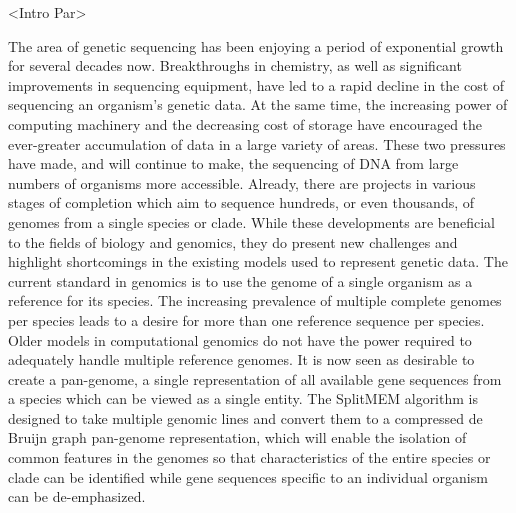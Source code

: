 \documentclass{paper}
\begin{document}
<Intro Par>
\newline\newline

The area of genetic sequencing has been enjoying a period of exponential growth for several decades now. Breakthroughs in chemistry, as well as significant improvements in sequencing equipment, have led to a rapid decline in the cost of sequencing an organism's genetic data. At the same time, the increasing power of computing machinery and the decreasing cost of storage have encouraged the ever-greater accumulation of data in a large variety of areas. These two pressures have made, and will continue to make, the sequencing of DNA from large numbers of organisms more accessible. Already, there are projects in various stages of completion which aim to sequence hundreds, or even thousands, of genomes from a single species or clade. While these developments are beneficial to the fields of biology and genomics, they do present new challenges and highlight shortcomings in the existing models used to represent genetic data. The current standard in genomics is to use the genome of a single organism as a reference for its species. The increasing prevalence of multiple complete genomes per species leads to a desire for more than one reference sequence per species. Older models in computational genomics do not have the power required to adequately handle multiple reference genomes. It is now seen as desirable to create a pan-genome, a single representation of all available gene sequences from a species which can be viewed as a single entity. The SplitMEM algorithm is designed to take multiple genomic lines and convert them to a compressed de Bruijn graph pan-genome representation, which will enable the isolation of common features in the genomes so that characteristics of the entire species or clade can be identified while gene sequences specific to an individual organism can be de-emphasized.
\newline\newline
\end{document}
